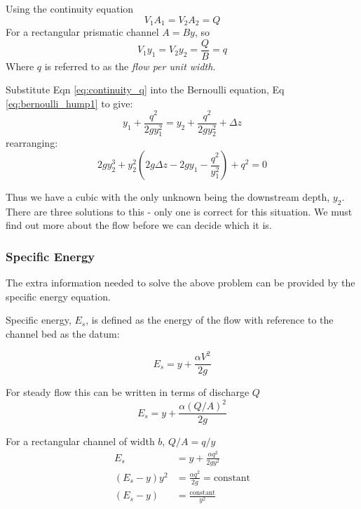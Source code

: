 \documentclass[a4paper, 12pt, british]{article} %
\numberwithin{equation}{section}
\numberwithin{figure}{section}
\numberwithin{table}{section}
\begin{document}
Using the continuity equation 
   \begin{equation}
 V_1 A_1 = V_2 A_2 = Q 
 \label{eq:continuity}
 \end{equation}
For a rectangular prismatic channel $A=By$, so
   \begin{equation}
V_1 y_1 = V_2 y_2 = \frac{Q}{B} = q 
\label{eq:continuity_q}
\end{equation}
Where $q$ is referred to as the \textit{flow per unit width}. 

Substitute Eqn \ref{eq:continuity_q} into the Bernoulli equation, Eq \ref{eq:bernoulli_hump1} to give:
   \begin{equation}
 y_1  + \frac{ q^2}{2gy_1^2}   = y_2  + \frac{ q^2}{2gy_2^2}  +\Delta z
 \label{eq:bernoulli_hump2}
 \end{equation}
rearranging:
   \begin{equation}
2gy_2^3  + y_2^2 \left(2g\Delta z - 2g y_1 - \frac{q^2}{y_1^2}\right) + q^2=0
\label{eq:bernoulli_hump3}
\end{equation}
 

Thus we have a cubic with the only unknown being the downstream depth, $y_2$. There are three solutions to this - only one is correct for this situation. We must find out more about the flow before we can decide which it is.

\subsubsection{Specific Energy}

The extra information needed to solve the above problem can be provided by the specific energy equation. 

Specific energy, $E_s$,  is defined as the energy of the flow with reference to the channel bed as the datum:

   \begin{equation}
E_s = y  + \frac{ \alpha V^2}{2g}
\label{eq:specific_energy}
\end{equation} 

For steady flow this can be written in terms of discharge $Q$
   \begin{equation}
E_s = y  + \frac{ \alpha (Q/A)^2}{2g}
\label{eq:specific_energyQ}
\end{equation} 

 


For a rectangular channel of width $b$, $Q/A = q/y$
   \begin{align*}
E_s &= y  + \frac{ \alpha q^2}{2gy^2}\\
(E_s - y)y^2 &= \frac{\alpha q^2}{2g} = \text{constant} \\
(E_s - y) &= \frac{\text{constant}}{y^2}
\label{eq:specific_energy_rect_q}
\end{align*} 
 
\end{document}
